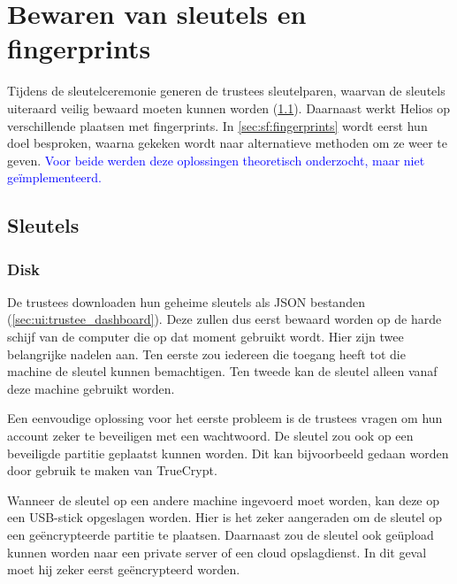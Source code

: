 % 
%

\chapter{Bewaren van sleutels en fingerprints}
\label{chap:sleutels_en_fingerprints}


Tijdens de sleutelceremonie generen de trustees sleutelparen, waarvan de sleutels uiteraard veilig bewaard moeten kunnen worden (\ref{sec:sf:sleutels}). Daarnaast werkt Helios op verschillende plaatsen met fingerprints. In \ref{sec:sf:fingerprints} wordt eerst hun doel besproken, waarna gekeken wordt naar alternatieve methoden om ze weer te geven. \textcolor{blue}{Voor beide werden deze oplossingen theoretisch onderzocht, maar niet ge\"implementeerd.}

\section{Sleutels}
\label{sec:sf:sleutels}

\subsection{Disk}
\label{sec:sf:disk}

De trustees downloaden hun geheime sleutels als JSON bestanden (\ref{sec:ui:trustee_dashboard}). Deze zullen dus eerst bewaard worden op de harde schijf van de computer die op dat moment gebruikt wordt. Hier zijn twee belangrijke nadelen aan. Ten eerste zou iedereen die toegang heeft tot die machine de sleutel kunnen bemachtigen. Ten tweede kan de sleutel alleen vanaf deze machine gebruikt worden.

\npar Een eenvoudige oplossing voor het eerste probleem is de trustees vragen om hun account zeker te beveiligen met een wachtwoord. De sleutel zou ook op een beveiligde partitie geplaatst kunnen worden. Dit kan bijvoorbeeld gedaan worden door gebruik te maken van TrueCrypt.\cite{site:truecrypt}

\npar Wanneer de sleutel op een andere machine ingevoerd moet worden, kan deze op een USB-stick opgeslagen worden. Hier is het zeker aangeraden om de sleutel op een ge\"encrypteerde partitie te plaatsen. Daarnaast zou de sleutel ook ge\"upload kunnen worden naar een private server of een cloud opslagdienst. In dit geval moet hij zeker eerst ge\"encrypteerd worden.

